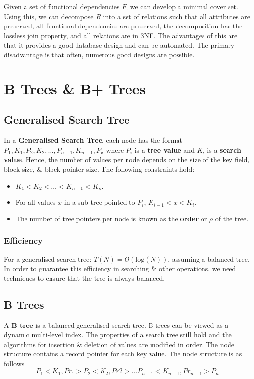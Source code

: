 \documentclass[a4paper,11pt]{article}
\begin{document}
Given a set of functional dependencies $F$, we can develop a minimal cover set. 
Using this, we can decompose $R$ into a set of relations such that all attributes are preserved, all functional 
dependencies are preserved, the decomposition has the lossless join property, and all relations are in 3NF.
The advantages of this are that it provides a good database design and can be automated.
The primary disadvantage is that often, numerous good designs are possible.

\section{B Trees \& B+ Trees}
\subsection{Generalised Search Tree}
In a \textbf{Generalised Search Tree}, each node has the format $P_1, K_1, P_2, K_2, \dots, P_{n-1}, K_{n-1}, P_n$ 
where $P_i$ is a \textbf{tree value} and $K_i$ is a \textbf{search value}.
Hence, the number of values per node depends on the size of the key field, block size, \& block pointer size.
The following constraints hold:
\begin{itemize}
    \item   $K_1 < K_2 < \dots < K_{n-1} < K_n$.
    \item   For all values $x$ in a sub-tree pointed to $P_i$, $K_{i-1} < x < K_i$.
    \item   The number of tree pointers per node is known as the \textbf{order} or $\rho$ of the tree.
\end{itemize}

\subsubsection{Efficiency}
For a generalised search tree: $T(N) = O(\text{log}(N))$, assuming a balanced tree. 
In order to guarantee this efficiency in searching \& other operations, we need techniques to ensure that the tree is
always balanced.

\subsection{B Trees}
A \textbf{B tree} is a balanced generalised search tree.
B trees can be viewed as a dynamic multi-level index. 
The properties of a search tree still hold and the algorithms for insertion \& deletion of values are modified in order.
The node structure contains a record pointer for each key value.
The node structure is as follows:
$$
P_1 < K_1, Pr_1 > P_2 < K_2, Pr2 > \dots P_{n-1} < K_{n-1}, Pr_{n-1} > P_n
$$
\end{document}
